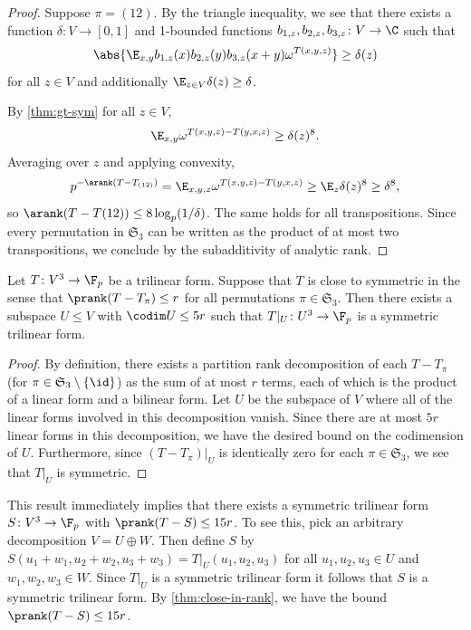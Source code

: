 \begin{proof}
Suppose $\pi=(12)$. By the triangle inequality, we see that there exists a function $\delta\colon V\to[0,1]$ and 1-bounded functions $b_{1,z},b_{2,z},b_{3,z}\colon V\to\C$ such that
\[\abs{\E_{x,y}b_{1,z}(x)b_{2,z}(y)b_{3,z}(x+y)\omega^{T(x,y,z)}}\geq\delta(z)\] for all $z\in V$ and additionally $\E_{z\in V}\delta(z)\geq \delta$.

By \cref{thm:gt-sym} for all $z\in V$, \[\E_{x,y}\omega^{T(x,y,z)-T(y,x,z)}\geq\delta(z)^8.\] Averaging over $z$ and applying convexity,
\[p^{-\arank(T-T_{(12)})}=\E_{x,y,z}\omega^{T(x,y,z)-T(y,x,z)}\geq\E_{z}\delta(z)^8\geq\delta^8,\]so $\arank(T-T{(12)})\leq 8\log_p(1/\delta)$. The same holds for all transpositions. Since every permutation in $\mathfrak S_3$ can be written as the product of at most two transpositions, we conclude by the subadditivity of analytic rank. 
\end{proof}

\begin{prop}
\label{thm:first-sym}
Let $T\colon V^3\to \F_p$ be a trilinear form. Suppose that $T$ is close to symmetric in the sense that $\prank(T-T_\pi)\leq r$ for all permutations $\pi\in\mathfrak S_3$. Then there exists a subspace $U\leq V$ with $\codim U\leq 5r$ such that $T|_U\colon U^3\to\F_p$ is a symmetric trilinear form.
\end{prop}

\begin{proof}
By definition, there exists a partition rank decomposition of each $T-T_\pi$ (for $\pi\in\mathfrak S_3\setminus\{\id\}$) as the sum of at most $r$ terms, each of which is the product of a linear form and a bilinear form. Let $U$ be the subspace of $V$ where all of the linear forms involved in this decomposition vanish. Since there are at most $5r$ linear forms in this decomposition, we have the desired bound on the codimension of $U$. Furthermore, since $(T-T_\pi)|_U$ is identically zero for each $\pi\in\mathfrak S_3$, we see that $T|_U$ is symmetric.
\end{proof}

\begin{rem}
This result immediately implies that there exists a symmetric trilinear form $S\colon V^3\to\F_p$ with $\prank(T-S)\leq 15r$. To see this, pick an arbitrary decomposition $V=U\oplus W$. Then define $S$ by $S(u_1+ w_1,u_2+ w_2,u_3+ w_3)=T|_U(u_1,u_2,u_3)$ for all $u_1,u_2,u_3\in U$ and $w_1,w_2,w_3\in W$. Since $T|_U$ is a symmetric trilinear form it follows that $S$ is a symmetric trilinear form. By \cref{thm:close-in-rank},  we have the bound $\prank(T-S)\leq 15r$.
\end{rem}

